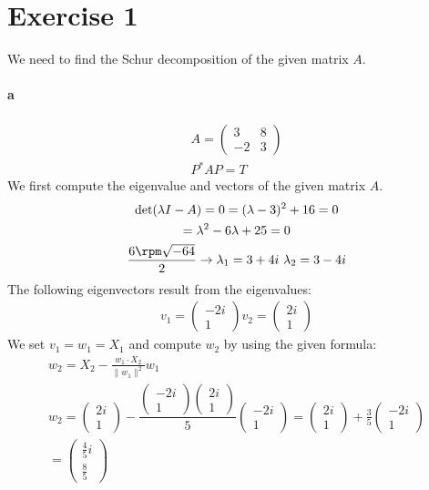 \section{Exercise 1}
We need to find the Schur decomposition of the given matrix $A$.
\paragraph{a}
\begin{gather*}
A = \left( \begin{array}{cc}
3 & 8 \\
-2 & 3 
\end{array} \right) \\
P^{*}AP = T
\end{gather*}
We first compute the eigenvalue and vectors of the given matrix $A$.
\begin{gather*}
\det( \lambda I - A ) = 0 = (\lambda -3 ) ^2 + 16 = 0 \\
= \lambda^2 - 6\lambda + 25 = 0 \\
\dfrac{6 \rpm \sqrt{-64}}{2} \rightarrow \lambda_1 = 3 + 4i \ \lambda_2 = 3 - 4i
\end{gather*}
The following eigenvectors result from the eigenvalues:
\begin{gather*}
v_1 = \left( \begin{array}{c}
-2i \\
1
\end{array} \right)
v_2 = \left( \begin{array}{c}
2 i \\
1
\end{array} \right)
\end{gather*}
We set $v_1 = w_1 = X_1$ and compute $w_2$ by using the given formula:
\begin{gather*}
w_{2}=X_{2}-\frac{w_{1}\cdot X_{2}}{\|w_{1}\|^{2}}w_{1} \\
w_2 =
\left( \begin{array}{c}
2i \\
1
\end{array} \right)
-
\dfrac{
\left( \begin{array}{c}
-2i \\
1
\end{array} \right)
\left( \begin{array}{c}
2i\\
1
\end{array} \right)
}{5} 
\left( \begin{array}{c}
-2i \\
1
\end{array} \right)
= 
\left( \begin{array}{c}
2i \\
1
\end{array} \right)
+ \frac{3}{5}
\left( \begin{array}{c}
-2i \\
1
\end{array} \right)\\
= 
\left( \begin{array}{c}
\frac{4}{5}i \\
\frac{8}{5}
\end{array} \right)\\
\end{gather*}
